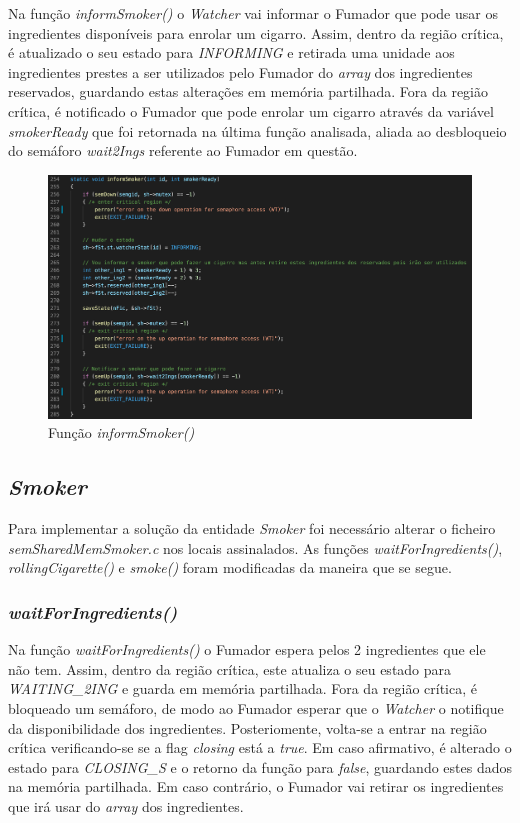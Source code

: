 \documentclass[10pt,portuguese]{article}
\begin{document}
\par Na função \textit{informSmoker()} o \textit{Watcher} vai informar o Fumador que pode usar os ingredientes disponíveis para enrolar um cigarro. Assim, dentro da região crítica, é atualizado o seu estado para \textit{INFORMING} e retirada uma unidade aos ingredientes prestes a ser utilizados pelo Fumador do \textit{array} dos ingredientes reservados, guardando estas alterações em memória partilhada. Fora da região crítica, é notificado o Fumador que pode enrolar um cigarro através da variável \textit{smokerReady} que foi retornada na última função analisada, aliada ao desbloqueio do semáforo \textit{wait2Ings} referente ao Fumador em questão.

\begin{figure}[!h]
    \centering
    \includegraphics[width=\textwidth]{images/implementation/informsmok.png}
    \caption{Função \textit{informSmoker()}}
\end{figure}

\subsection{\textit{Smoker}}
\par Para implementar a solução da entidade \textit{Smoker} foi necessário alterar o ficheiro \textit{semSharedMemSmoker.c} nos locais assinalados. As funções \textit{waitForIngredients()}, \textit{rollingCigarette()} e \textit{smoke()} foram modificadas da maneira que se segue.

\subsubsection{\textit{waitForIngredients()}}

\par Na função \textit{waitForIngredients()} o Fumador espera pelos 2 ingredientes que ele não tem. Assim, dentro da região crítica, este atualiza o seu estado para \textit{WAITING\_2ING} e guarda em memória partilhada. Fora da região crítica, é bloqueado um semáforo, de modo ao Fumador esperar que o \textit{Watcher} o notifique da disponibilidade dos ingredientes. Posteriomente, volta-se a entrar na região crítica verificando-se se a flag \textit{closing} está a \textit{true}. Em caso afirmativo, é alterado o estado para \textit{CLOSING\_S} e o retorno da função para \textit{false}, guardando estes dados na memória partilhada. Em caso contrário, o Fumador vai retirar os ingredientes que irá usar do \textit{array} dos ingredientes.
\end{document}
